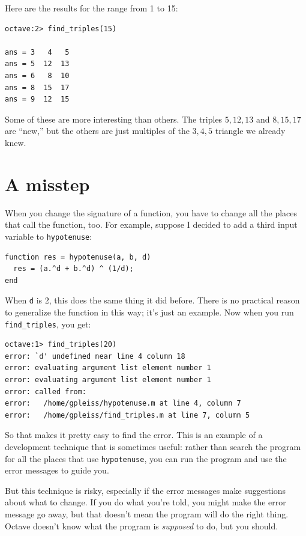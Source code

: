 \documentclass{book}
\begin{document}
Here are the results for the range from 1 to 15:

\begin{verbatim}
octave:2> find_triples(15)

ans = 3   4   5
ans = 5  12  13
ans = 6   8  10
ans = 8  15  17
ans = 9  12  15
\end{verbatim}

Some of these are more interesting than others. The triples
$5,12,13$ and $8,15,17$ are ``new,'' but the others are just
multiples of the $3,4,5$ triangle we already knew.


\section{A misstep}

When you change the signature of a function, you have to change all
the places that call the function, too. For example, suppose
I decided to add a third input variable to {\tt hypotenuse}:

\begin{verbatim}
function res = hypotenuse(a, b, d)
  res = (a.^d + b.^d) ^ (1/d);
end
\end{verbatim}

When {\tt d} is 2, this does the same thing it did before. There is
no practical reason to generalize the function in this way; it's just
an example. Now when you run {\tt find\_triples}, you get:

\begin{verbatim}
octave:1> find_triples(20)
error: `d' undefined near line 4 column 18
error: evaluating argument list element number 1
error: evaluating argument list element number 1
error: called from:
error:   /home/gpleiss/hypotenuse.m at line 4, column 7
error:   /home/gpleiss/find_triples.m at line 7, column 5
\end{verbatim}

So that makes it pretty easy to find the error. This is an example of
a development technique that is sometimes useful: rather
than search the program for all the places that use {\tt hypotenuse},
you can run the program and use the error messages to guide you.

But this technique is risky, especially if the error messages make
suggestions about what to change. If you do what you're told, you
might make the error message go away, but that doesn't mean the
program will do the right thing. Octave doesn't know what the program
is {\em supposed} to do, but you should.
\end{document}
